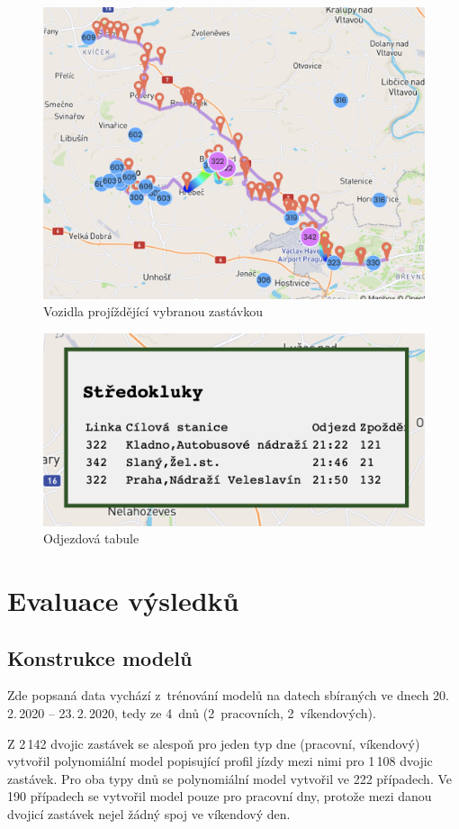 \begin{figure}
   \centering
 \includegraphics[width=0.7\linewidth]{../img/more_trips.png}
 \caption{Vozidla projíždějící vybranou zastávkou}
 \label{fig:more_trips}
\end{figure}


\begin{figure}
   \centering
 \includegraphics[width=0.4\linewidth]{../img/stredokluky_table.png}
 \caption{Odjezdová tabule}
 \label{fig:stredokluky_table}
\end{figure}


\section{Evaluace výsledků}

\subsection{Konstrukce modelů}

Zde popsaná data vychází z~trénování modelů na datech sbíraných ve dnech 20.\,2.\,2020 -- 23.\,2.\,2020, tedy ze 4~dnů (2~pracovních, 2~víkendových).


\bigbreak

Z 2\,142 dvojic zastávek se alespoň pro jeden typ dne (pracovní, víkendový) vytvořil polynomiální model popisující profil jízdy mezi nimi pro 1\,108 dvojic zastávek. Pro oba typy dnů se polynomiální model vytvořil ve 222 případech. Ve 190 případech se vytvořil model pouze pro pracovní dny, protože mezi danou dvojicí zastávek nejel žádný spoj ve víkendový den.

